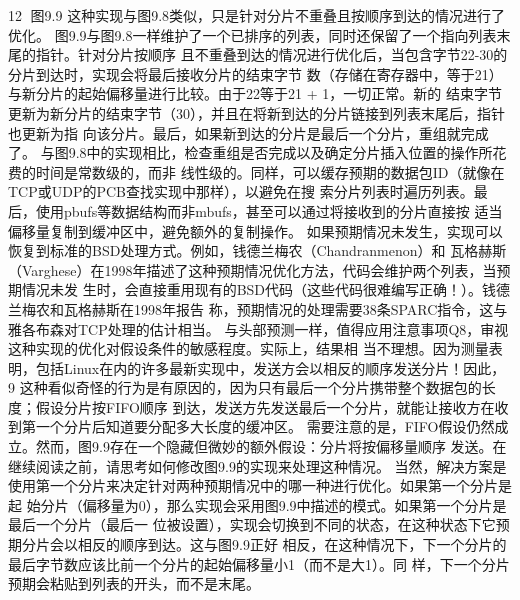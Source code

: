                                                  12
图9.9 这种实现与图9.8类似，只是针对分片不重叠且按顺序到达的情况进行了优化。
图9.9与图9.8一样维护了一个已排序的列表，同时还保留了一个指向列表末尾的指针。针对分片按顺序
且不重叠到达的情况进行优化后，当包含字节22-30的分片到达时，实现会将最后接收分片的结束字节
数（存储在寄存器中，等于21）与新分片的起始偏移量进行比较。由于22等于21 + 1，一切正常。新的
结束字节更新为新分片的结束字节（30），并且在将新到达的分片链接到列表末尾后，指针也更新为指
向该分片。最后，如果新到达的分片是最后一个分片，重组就完成了。
与图9.8中的实现相比，检查重组是否完成以及确定分片插入位置的操作所花费的时间是常数级的，而非
线性级的。同样，可以缓存预期的数据包ID（就像在TCP或UDP的PCB查找实现中那样），以避免在搜
索分片列表时遍历列表。最后，使用pbufs等数据结构而非mbufs，甚至可以通过将接收到的分片直接按
适当偏移量复制到缓冲区中，避免额外的复制操作。
如果预期情况未发生，实现可以恢复到标准的BSD处理方式。例如，钱德兰梅农（Chandranmenon）和
瓦格赫斯（Varghese）在1998年描述了这种预期情况优化方法，代码会维护两个列表，当预期情况未发
生时，会直接重用现有的BSD代码（这些代码很难编写正确！）。钱德兰梅农和瓦格赫斯在1998年报告
称，预期情况的处理需要38条SPARC指令，这与雅各布森对TCP处理的估计相当。
与头部预测一样，值得应用注意事项Q8，审视这种实现的优化对假设条件的敏感程度。实际上，结果相
当不理想。因为测量表明，包括Linux在内的许多最新实现中，发送方会以相反的顺序发送分片！因此，
9%
这种看似奇怪的行为是有原因的，因为只有最后一个分片携带整个数据包的长度；假设分片按FIFO顺序
到达，发送方先发送最后一个分片，就能让接收方在收到第一个分片后知道要分配多大长度的缓冲区。
需要注意的是，FIFO假设仍然成立。然而，图9.9存在一个隐藏但微妙的额外假设：分片将按偏移量顺序
发送。在继续阅读之前，请思考如何修改图9.9的实现来处理这种情况。
当然，解决方案是使用第一个分片来决定针对两种预期情况中的哪一种进行优化。如果第一个分片是起
始分片（偏移量为0），那么实现会采用图9.9中描述的模式。如果第一个分片是最后一个分片（最后一
位被设置），实现会切换到不同的状态，在这种状态下它预期分片会以相反的顺序到达。这与图9.9正好
相反，在这种情况下，下一个分片的最后字节数应该比前一个分片的起始偏移量小1（而不是大1）。同
样，下一个分片预期会粘贴到列表的开头，而不是末尾。

